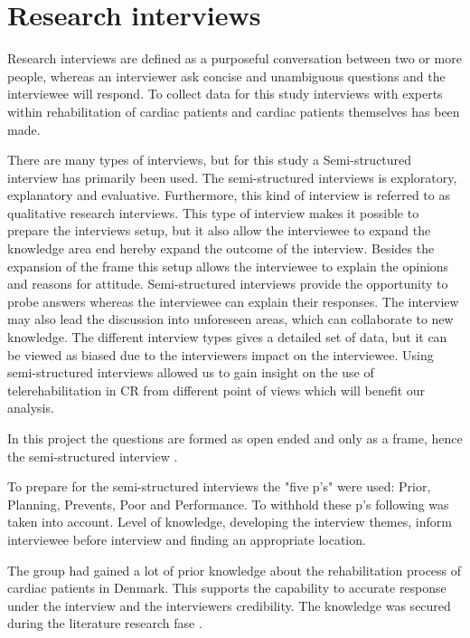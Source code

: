 
\section{Research interviews}
\label{qualitative}

Research interviews are defined as a purposeful conversation between two or more people, whereas an interviewer ask concise and unambiguous questions and the interviewee will respond. To collect data for this study interviews with experts within rehabilitation of  cardiac patients and cardiac patients themselves has been made. 

There are many types of interviews, but for this study a Semi-structured interview has primarily been used. The semi-structured interviews is exploratory, explanatory and evaluative. Furthermore, this kind of interview is referred to as qualitative research interviews.
This type of interview makes it possible to prepare the interviews setup, but it also allow the interviewee to expand the knowledge area end hereby expand the outcome of the interview. 
Besides the expansion of the frame this setup allows the interviewee to explain the opinions and reasons for attitude. Semi-structured interviews provide the opportunity to probe answers whereas the interviewee can explain their responses. The interview may also lead the discussion into unforeseen areas, which can collaborate to new knowledge. The different interview types gives a detailed set of data, but it can be viewed as biased due to the interviewers impact on the interviewee. Using semi-structured interviews allowed us to gain insight on the use of telerehabilitation in CR from different point of views which will benefit our analysis.

In this project the questions are formed as open ended and only as a frame, hence the semi-structured interview \cite{mark2009research}.

To prepare for the semi-structured interviews the "five p's" were used: Prior, Planning, Prevents, Poor and Performance. To withhold these p's following was taken into account. Level of knowledge, developing the interview themes, inform interviewee before interview and finding an appropriate location. 

The group had gained a lot of prior knowledge about the rehabilitation process of cardiac patients in Denmark. This supports the capability to accurate response under the interview and the interviewers credibility. The knowledge was secured during the literature research fase \cite{mark2009research}. 

